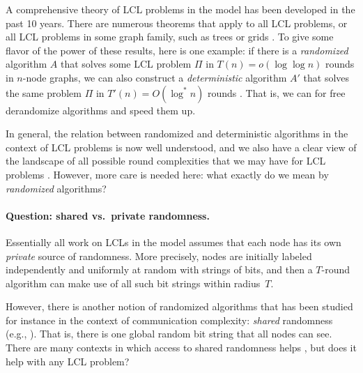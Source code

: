 \documentclass[11pt]{article}
\begin{document}
A comprehensive theory of LCL problems in the \local model has been developed in
the past 10 years. 
There are numerous theorems that apply to all LCL problems, or all LCL problems in some graph family, such as trees or grids \cite{balliu18lcl-complexity,balliu20almost-global,doi:10.1137/17M1157957,dist_deran,fischer_ghaffari2017sublogarithmic,Rozhon2019,brandt16lll,chang16exponential,ghaffari17distributed,ghaffari19degree-splitting,balliu19lcl-decidability,balliu21mm,how-much-does-randomness-help-lcls,brandt17grid-lcl,balliu22rooted-trees,balliu22regular-trees,balliu22regular-trees,chang23automata-theoretic}. To give some flavor of the power of these results, here is one example: if there is a \emph{randomized} \local algorithm $A$ that solves some LCL problem $\Pi$ in $T(n) = o(\log \log n)$ rounds in $n$-node graphs, we can also construct a \emph{deterministic} \local algorithm $A'$ that solves the same problem $\Pi$ in $T'(n) = O(\log^* n)$ rounds \cite{chang16exponential}. That is, we can for free derandomize algorithms and speed them up.

In general, the relation between randomized and deterministic algorithms in the
context of LCL problems is now well understood, and we also have a clear view of
the landscape of all possible round complexities that we may have for LCL
problems \cite{suomela-2020-landscape}. However, more care is needed here:
what exactly do we mean by \emph{randomized} \local algorithms?

\paragraph{Question: shared vs.\ private randomness.}

Essentially all work on LCLs in the \randlcl model assumes that each node has its own \emph{private} source of randomness. More precisely, nodes are initially labeled independently and uniformly at random with strings of bits, and then a $T$-round algorithm can make use of all such bit strings within radius~$T$.

However, there is another notion of randomized algorithms that has been studied
for instance in the context of communication complexity: \emph{shared}
randomness (e.g.,
\cite{kurri21_coordination_ieeetit,acharya19_communication_icml}).
That is, there is one global random bit string that all nodes can see.
There are many contexts in which access to shared randomness helps
\cite{rao20_communication_book,crescenzi19_trade_disc,montealegre20_shared_isaac},
but does it help with any LCL problem?
\end{document}
